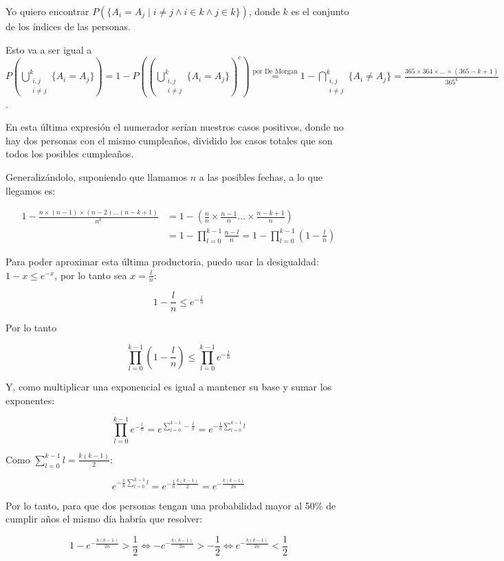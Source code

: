 \documentclass[12pt]{article}
\begin{document}
Yo quiero encontrar $P(\{A_i = A_j \mid i \neq j \land i \in k \land j \in k\})$, donde $k$ es el conjunto de los índices de las personas.

Esto va a ser igual a $P(\bigcup_{\substack{i,j \\ i \neq j}}^{k} \{ A_i = A_j \}) = 1 - P((\bigcup_{\substack{i,j \\ i \neq j}}^{k} \{ A_i = A_j \})^c) \overset{\text{por De Morgan}}{=} 1 -\bigcap_{\substack{i,j \\ i \neq j}}^{k} \{ A_i \neq A_j \} = \frac{365 \times 364 \times \ldots \times (365 - k + 1)}{365^k}$.

En esta última expresión el numerador serían nuestros casos positivos, donde no hay dos personas con el mismo cumpleaños, dividido los casos totales que son todos los posibles cumpleaños.

Generalizándolo, suponiendo que llamamos $n$ a las posibles fechas, a lo que llegamos es:

\begin{align*}
1 - \frac{n \times (n - 1) \times (n-2) \ldots (n - k + 1)}{n^k} 
&= 1 - \left(\frac{n}{n} \times \frac{n-1}{n} \ldots \times \frac{n - k + 1}{n}\right) \\
&= 1 - \prod_{l=0}^{k-1} \frac{n-l}{n} 
= 1 - \prod_{l=0}^{k-1} \left(1 - \frac{l}{n}\right)
\end{align*}


Para poder aproximar esta última productoria, puedo usar la desigualdad: $1 - x \leq e^{-x}$, por lo tanto sea $x = \frac{l}{n}$:

\[
1 - \frac{l}{n} \leq e^{-\frac{l}{n}}
\]

Por lo tanto

\[
\prod_{l=0}^{k-1} \left(1 - \frac{l}{n}\right) \leq \prod_{l=0}^{k-1} e^{-\frac{l}{n}}
\]

Y, como multiplicar una exponencial es igual a mantener su base y sumar los exponentes:

\[
\prod_{l=0}^{k-1} e^{-\frac{l}{n}} = e^{\sum_{l=0}^{k-1}-\frac{l}{n}} = e^{-\frac{1}{n}\sum_{l=0}^{k-1}l}
\]

Como $\sum_{l=0}^{k-1}l = \frac{k(k-1)}{2}$:

\[
e^{-\frac{1}{n}\sum_{l=0}^{k-1}l} = e^{-\frac{1}{n}\frac{k(k-1)}{2}} = e^{-\frac{k(k-1)}{2n}}
\]

Por lo tanto, para que dos personas tengan una probabilidad mayor al 50\% de cumplir años el mismo día habría que resolver:

\[
1 - e^{-\frac{k(k-1)}{2n}} > \frac{1}{2} \iff -e^{-\frac{k(k-1)}{2n}} > -\frac{1}{2} \iff e^{-\frac{k(k-1)}{2n}} < \frac{1}{2}
\]
\end{document}
